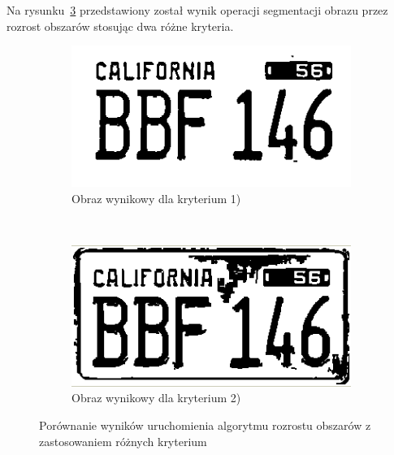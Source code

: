 Na rysunku~\ref{fig:region_growing} przedstawiony został wynik operacji segmentacji obrazu przez rozrost obszarów stosując dwa różne kryteria.
\begin{figure}
  \centering
  \begin{subfigure}[b]{0.45\textwidth}
    \includegraphics[width=\textwidth]{img/region-growing-relative}
    \caption{Obraz wynikowy dla kryterium 1)}
    \label{fig:region_growing_relative}
  \end{subfigure}
  ~
  \begin{subfigure}[b]{0.45\textwidth}
    \includegraphics[width=\textwidth]{img/region-growing-absolute}
    \caption{Obraz wynikowy dla kryterium 2)}
    \label{fig:region_growing_absolute}
  \end{subfigure}
  \caption{Porównanie wyników uruchomienia algorytmu rozrostu obszarów z zastosowaniem różnych kryterium}
    \label{fig:region_growing}
\end{figure}

